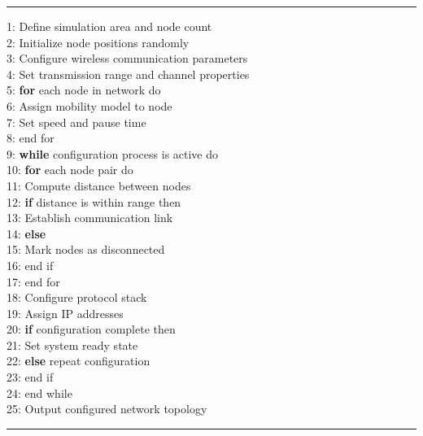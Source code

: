 \documentclass[a4paper,fleqn]{cas-dc}
\numberwithin{equation}{section}
\begin{document}
\noindent\rule{\linewidth}{0.5pt}
\hspace{0.5cm}1: Define simulation area and node count \\
\hspace{0.5cm}2: Initialize node positions randomly \\
\hspace{0.5cm}3: Configure wireless communication parameters \\
\hspace{0.5cm}4: Set transmission range and channel properties \\
\hspace{0.5cm}5: \textbf{for} each node in network do \\
\hspace{0.5cm}6: Assign mobility model to node \\
\hspace{0.5cm}7: Set speed and pause time \\
\hspace{0.5cm}8: end for \\
\hspace{0.5cm}9: \textbf{while} configuration process is active do \\
\hspace{0.5cm}10: \textbf{for} each node pair do \\
\hspace{0.5cm}11: Compute distance between nodes \\
\hspace{0.5cm}12: \textbf{if} distance is within range then \\
\hspace{0.5cm}13: Establish communication link \\
\hspace{0.5cm}14: \textbf{else} \\
\hspace{0.5cm}15: Mark nodes as disconnected \\
\hspace{0.5cm}16: end if \\
\hspace{0.5cm}17: end for \\
\hspace{0.5cm}18: Configure protocol stack \\
\hspace{0.5cm}19: Assign IP addresses \\
\hspace{0.5cm}20: \textbf{if} configuration complete then \\
\hspace{0.5cm}21: Set system ready state \\
\hspace{0.5cm}22: \textbf{else} repeat configuration \\
\hspace{0.5cm}23: end if \\
\hspace{0.5cm}24: end while \\
\hspace{0.5cm}25: Output configured network topology \\
\noindent\rule{\linewidth}{0.5pt}
\end{document}

